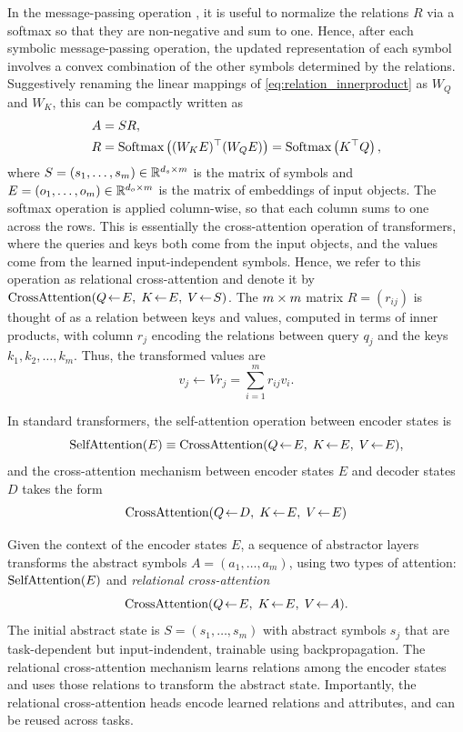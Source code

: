 In the message-passing operation , it is useful to normalize the relations $R$ via a softmax so that they are non-negative and sum to one. Hence, after each symbolic message-passing operation, the updated representation of each symbol involves a convex combination of the other symbols determined by the relations. Suggestively renaming the linear mappings of \eqref{eq:relation_innerproduct} as $W_Q$ and $W_K$, this can be compactly written as
\begin{equation}
    \label{eq:relational_crossattention}
    \begin{split}
        A &= S R, \\
        R &= \text{Softmax}\left((W_K E)^\top (W_Q E)\right) = \text{Softmax}\left(K^\top Q\right),
    \end{split}
\end{equation}
where $S = (s_1, \ldots, s_m) \in \mathbb{R}^{d_s \times m}$ is the matrix of symbols and $E
= (o_1, \ldots, o_m) \in \mathbb{R}^{d_o \times m}$ is the matrix of embeddings of input objects. 
The softmax operation is applied column-wise, so that each column sums to one across the rows.
This is essentially the cross-attention operation of transformers, where the queries and keys both come from the input objects, and the values come from the learned input-independent symbols. Hence, we refer to this operation as relational cross-attention and denote it by $\mbox{CrossAttention}(Q\!\leftarrow\!E,\; K\!\leftarrow\!E,\; V\!\leftarrow\!S)$. 
The $m\times m$ matrix $R = (r_{ij})$ is thought of 
as a relation between keys and values, computed in terms of inner products, with column $r_j$ 
encoding the relations between query $q_j$ and the keys $k_1, k_2, \ldots, k_m$. Thus, the transformed 
values are 
\begin{equation*}
    v_j \leftarrow V r_j = \sum_{i=1}^m r_{ij} v_i .
\end{equation*}

In standard transformers, the self-attention operation between encoder 
states is 
\begin{equation*}
    \mbox{SelfAttention}(E) \equiv \mbox{CrossAttention}(Q\!\leftarrow\!E,\; K\!\leftarrow\!E,\; V\!\leftarrow\!E),
\end{equation*} 
and the cross-attention mechanism between encoder states $E$ and decoder states $D$ takes the form 
\begin{equation*}
     \mbox{CrossAttention}(Q\!\leftarrow\!D,\; K\!\leftarrow\!E,\; V\!\leftarrow\!E)
\end{equation*}


Given the context of the encoder states $E$, a sequence of abstractor layers transforms the abstract symbols $A = (a_1,\ldots, a_m)$, using two types of attention: $\mbox{SelfAttention}(E)$ and 
\textit{relational cross-attention}
\begin{equation*}
    \mbox{CrossAttention}(Q\!\leftarrow\!E,\; K\!\leftarrow\!E,\; V\!\leftarrow\!A).
\end{equation*}
The initial abstract state is $S = (s_1,\ldots, s_m)$
with abstract symbols $s_j$ that are task-dependent but input-indendent, trainable using
backpropagation. The relational cross-attention mechanism learns relations among the encoder states and uses those
relations to transform the abstract state. Importantly, the relational cross-attention heads
encode learned relations and attributes, and can be reused across tasks.

